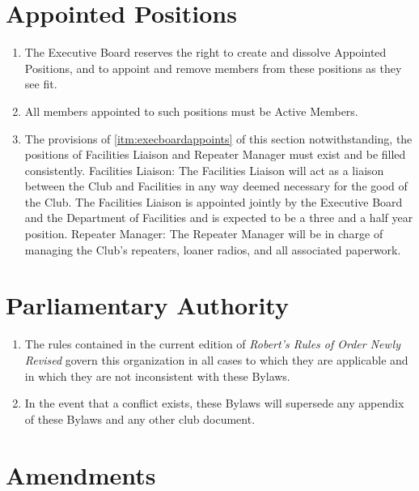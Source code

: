 \documentclass[12pt,letterpaper,oneside]{book}
\begin{document}
\chapter{Appointed Positions}

\begin{enumerate}

\item \label{itm:execboardappoints} The Executive Board reserves the right to create and dissolve Appointed Positions, and to appoint and remove members from these positions as they see fit.
\item All members appointed to such positions must be Active Members.
\item The provisions of \cref{itm:execboardappoints} of this section notwithstanding, the positions of Facilities Liaison and Repeater Manager must exist and be filled consistently.
\subitem Facilities Liaison: The Facilities Liaison will act as a liaison between the Club and Facilities in any way deemed necessary for the good of the Club. The Facilities Liaison is appointed jointly by the Executive Board and the Department of Facilities and is expected to be a three and a half year position.
\subitem Repeater Manager: The Repeater Manager will be in charge of managing the Club’s repeaters, loaner radios, and all associated paperwork.

\end{enumerate}

\chapter{Parliamentary Authority} \label{chap:parliamentaryauthority}

\begin{enumerate}

\item The rules contained in the current edition of \textit{Robert's Rules of Order Newly Revised} govern this organization in all cases to which they are applicable and in which they are not inconsistent with these Bylaws.
\item \label{itm:bylawssupersede} In the event that a conflict exists, these Bylaws will supersede any appendix of these Bylaws and any other club document.

\end{enumerate}

\chapter{Amendments}
\end{document}
